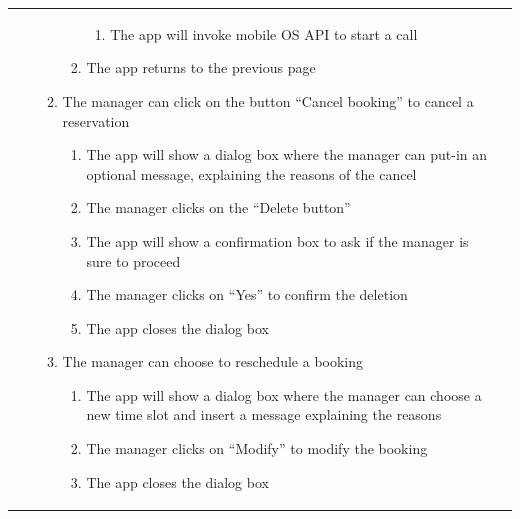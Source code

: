 \documentclass{article}
\begin{document}
\begin{center}
\begin{adjustwidth}{-1.5cm}{}
\begin{tabular}[h!]{|m{7.5em}|m{27.5em}|}
\begin{enumerate}
\begin{enumerate}
\begin{enumerate}
										\begin{enumerate}
											
											\item The app will invoke mobile OS API to start a call
											
										\end{enumerate}
									
										\item The app returns to the previous page
										
										
									\end{enumerate}
								
									\item The manager can click on the button “Cancel booking” to cancel a reservation
									
									\begin{enumerate}
										
										\item The app will show a dialog box where the manager can put-in an optional message, explaining the reasons of the cancel
										\item The manager clicks on the “Delete button”
										\item The app will show a confirmation box to ask if the manager is sure to proceed
										\item The manager clicks on “Yes” to confirm the deletion
										\item The app closes the dialog box
										
									\end{enumerate}
								
									\item The manager can choose to reschedule a booking
									
									\begin{enumerate}
										
										\item The app will show a dialog box where the manager can choose a new time slot and insert a message explaining the reasons
										\item The manager clicks on “Modify” to modify the booking
										\item The app closes the dialog box
										
									\end{enumerate}
									
								\end{enumerate}
								

\end{enumerate}
\end{tabular}
\end{adjustwidth}
\end{center}
\end{document}
